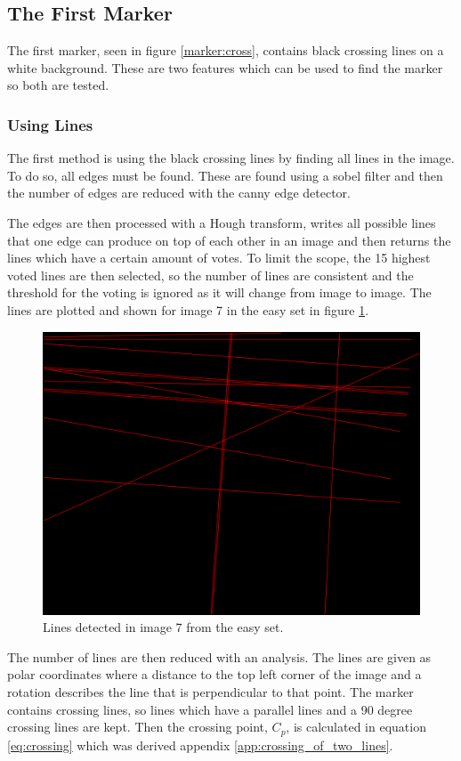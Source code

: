 \subsection{The First Marker}
The first marker, seen in figure \ref{marker:cross}, contains black crossing lines on a white background.
These are two features which can be used to find the marker so both are tested.

\subsubsection{Using Lines}
The first method is using the black crossing lines by finding all lines in the image.
To do so, all edges must be found.
These are found using a sobel filter and then the number of edges are reduced with the canny edge detector.

The edges are then processed with a Hough transform, writes all possible lines that one edge can produce on top of each other in an image and then returns the lines which have a certain amount of votes.
To limit the scope, the 15 highest voted lines are then selected, so the number of lines are consistent and the threshold for the voting is ignored as it will change from image to image.
The lines are plotted and shown for image 7 in the easy set in figure \ref{fig:lines_in_image}.


\begin{figure}[h]
 \centering
 \includegraphics[width=0.6\linewidth]{graphics/Lines_in_image}
 \caption{Lines detected in image 7 from the easy set.}
 \label{fig:lines_in_image}
\end{figure}

The number of lines are then reduced with an analysis.
The lines are given as polar coordinates where a distance to the top left corner of the image and a rotation describes the line that is perpendicular to that point.
The marker contains crossing lines, so lines which have a parallel lines and a 90 degree crossing lines are kept.
Then the crossing point, $C_p$, is calculated in equation \ref{eq:crossing} which was derived appendix \ref{app:crossing_of_two_lines}.

